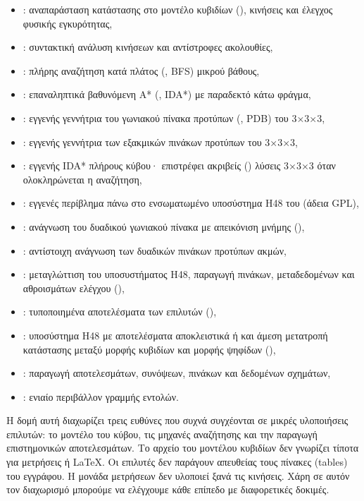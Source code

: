 \begin{itemize}
\item {}: αναπαράσταση κατάστασης στο μοντέλο κυβιδίων (), κινήσεις και έλεγχος φυσικής εγκυρότητας,
\item {}: συντακτική ανάλυση κινήσεων και αντίστροφες ακολουθίες,
\item {}: πλήρης αναζήτηση κατά πλάτος (, BFS) μικρού βάθους,
\item {}: επαναληπτικά βαθυνόμενη A* (, IDA*) με παραδεκτό κάτω φράγμα,
\item {}: εγγενής γεννήτρια του γωνιακού πίνακα προτύπων (, PDB) του 3×3×3,
\item {}: εγγενής γεννήτρια των εξακμικών πινάκων προτύπων του 3×3×3,
\item {}: εγγενής IDA* πλήρους κύβου· επιστρέφει ακριβείς () λύσεις 3×3×3 όταν ολοκληρώνεται η αναζήτηση,
\item {}: εγγενές περίβλημα πάνω στο ενσωματωμένο υποσύστημα H48 του  (άδεια GPL),
\item {}: ανάγνωση του δυαδικού γωνιακού πίνακα με απεικόνιση μνήμης (),
\item {}: αντίστοιχη ανάγνωση των δυαδικών πινάκων προτύπων ακμών,
\item {}: μεταγλώττιση του υποσυστήματος H48, παραγωγή πινάκων, μεταδεδομένων και αθροισμάτων ελέγχου (),
\item {}: τυποποιημένα αποτελέσματα των επιλυτών (),
\item {}: υποσύστημα H48 με αποτελέσματα αποκλειστικά  ή  και άμεση μετατροπή κατάστασης μεταξύ μορφής κυβιδίων και μορφής ψηφίδων (),
\item {}: παραγωγή αποτελεσμάτων, συνόψεων, πινάκων και δεδομένων σχημάτων,
\item {}: ενιαίο περιβάλλον γραμμής εντολών.
\end{itemize}

Η δομή αυτή διαχωρίζει τρεις ευθύνες που συχνά συγχέονται σε μικρές υλοποιήσεις επιλυτών: το μοντέλο του κύβου, τις μηχανές αναζήτησης και την παραγωγή επιστημονικών αποτελεσμάτων. Το αρχείο του μοντέλου κυβιδίων δεν γνωρίζει τίποτα για μετρήσεις ή LaTeX. Οι επιλυτές δεν παράγουν απευθείας τους πίνακες (tables) του εγγράφου. Η μονάδα μετρήσεων δεν υλοποιεί ξανά τις κινήσεις. Χάρη σε αυτόν τον διαχωρισμό μπορούμε να ελέγχουμε κάθε επίπεδο με διαφορετικές δοκιμές.

